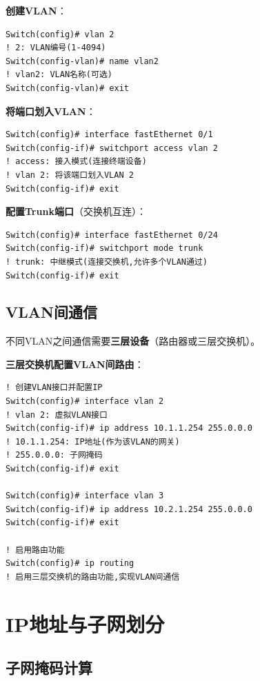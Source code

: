 \documentclass[12pt,a4paper]{ctexart}
\begin{document}
\begin{cmdbox}
\textbf{创建VLAN}：
\begin{lstlisting}
Switch(config)# vlan 2
! 2: VLAN编号(1-4094)
Switch(config-vlan)# name vlan2
! vlan2: VLAN名称(可选)
Switch(config-vlan)# exit
\end{lstlisting}

\textbf{将端口划入VLAN}：
\begin{lstlisting}
Switch(config)# interface fastEthernet 0/1
Switch(config-if)# switchport access vlan 2
! access: 接入模式(连接终端设备)
! vlan 2: 将该端口划入VLAN 2
Switch(config-if)# exit
\end{lstlisting}

\textbf{配置Trunk端口}（交换机互连）：
\begin{lstlisting}
Switch(config)# interface fastEthernet 0/24
Switch(config-if)# switchport mode trunk
! trunk: 中继模式(连接交换机,允许多个VLAN通过)
Switch(config-if)# exit
\end{lstlisting}
\end{cmdbox}

\subsection{VLAN间通信}

\begin{keybox}
不同VLAN之间通信需要\textbf{三层设备}（路由器或三层交换机）。

\textbf{三层交换机配置VLAN间路由}：
\begin{lstlisting}
! 创建VLAN接口并配置IP
Switch(config)# interface vlan 2
! vlan 2: 虚拟VLAN接口
Switch(config-if)# ip address 10.1.1.254 255.0.0.0
! 10.1.1.254: IP地址(作为该VLAN的网关)
! 255.0.0.0: 子网掩码
Switch(config-if)# exit

Switch(config)# interface vlan 3
Switch(config-if)# ip address 10.2.1.254 255.0.0.0
Switch(config-if)# exit

! 启用路由功能
Switch(config)# ip routing
! 启用三层交换机的路由功能,实现VLAN间通信
\end{lstlisting}
\end{keybox}

\section{IP地址与子网划分}

\subsection{子网掩码计算}
\end{document}
